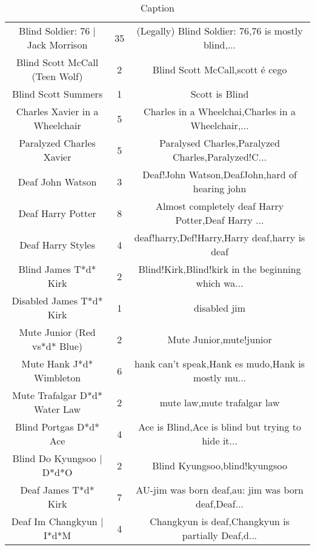 \begin{table}[h!]
{\begin{tabular}{|c|c|c|}
                 Blind Soldier: 76 | Jack Morrison &     35 & (Legally) Blind Soldier: 76,76 is mostly blind,... \\
                    Blind Scott McCall (Teen Wolf) &      2 &                    Blind Scott McCall,scott é cego \\
                               Blind Scott Summers &      1 &                                     Scott is Blind \\
                    Charles Xavier in a Wheelchair &      5 & Charles in a Wheelchai,Charles in a Wheelchair,... \\
                          Paralyzed Charles Xavier &      5 & Paralysed Charles,Paralyzed Charles,Paralyzed!C... \\
                                  Deaf John Watson &      3 &     Deaf!John Watson,DeafJohn,hard of hearing john \\
                                 Deaf Harry Potter &      8 & Almost completely deaf Harry Potter,Deaf Harry ... \\
                                 Deaf Harry Styles &      4 &      deaf!harry,Def!Harry,Harry deaf,harry is deaf \\
                             Blind James T*d* Kirk &      2 & Blind!Kirk,Blind!kirk in the beginning which wa... \\
                          Disabled James T*d* Kirk &      1 &                                       disabled jim \\
                      Mute Junior (Red vs*d* Blue) &      2 &                            Mute Junior,mute!junior \\
                          Mute Hank J*d* Wimbleton &      6 & hank can't speak,Hank es mudo,Hank is mostly mu... \\
                     Mute Trafalgar D*d* Water Law &      2 &                        mute law,mute trafalgar law \\
                            Blind Portgas D*d* Ace &      4 & Ace is Blind,Ace is blind but trying to hide it... \\
                         Blind Do Kyungsoo | D*d*O &      2 &                      Blind Kyungsoo,blind!kyungsoo \\
                              Deaf James T*d* Kirk &      7 & AU-jim was born deaf,au: jim was born deaf,Deaf... \\
                         Deaf Im Changkyun | I*d*M &      4 & Changkyun is deaf,Changkyun is partially Deaf,d... \\
\hline
\end{tabular}}
 \caption{Caption}
 \label{tab:my_label}
\end{table}
